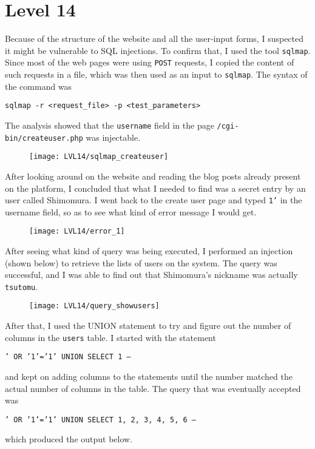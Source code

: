 \documentclass[12pt,a4paper]{article}
\begin{document}
	\section*{Level 14}
	Because of the structure of the website and all the user-input forms, I suspected it might be vulnerable to SQL injections. To confirm that, I used the tool \texttt{sqlmap}. Since most of the web pages were using \texttt{POST} requests, I copied the content of such requests in a file, which was then used as an input to \texttt{sqlmap}. The syntax of the command was \begin{center}\texttt{sqlmap -r <request\_file> -p <test\_parameters>}\end{center}The analysis showed that the \texttt{username} field in the page \texttt{/cgi-bin/createuser.php} was injectable.
	\begin{figure}[H]
		\centering
		\texttt{[image: LVL14/sqlmap\_createuser]}
		\label{fig:sqlmap}
	\end{figure}
	After looking around on the website and reading the blog posts already present on the platform, I concluded that what I needed to find was a secret entry by an user called Shimomura. I went back to the create user page and typed \texttt{1'} in the username field, so as to see what kind of error message I would get.
	\begin{figure}[H]
		\centering
		\texttt{[image: LVL14/error\_1]}
		\label{fig:error1}
	\end{figure}
	After seeing what kind of query was being executed, I performed an injection (shown below) to retrieve the lists of users on the system. The query was successful, and I was able to find out that Shimomura's nickname was actually \texttt{tsutomu}. 
	\begin{figure}[H]
	\centering
	\texttt{[image: LVL14/query\_showusers]}
	\label{fig:showusers}
	\end{figure}
	After that, I used the UNION statement to try and figure out the number of columns in the \texttt{users} table. I started with the statement \begin{center}\texttt{' OR '1'='1' UNION SELECT 1 -- }\end{center} and kept on adding columns to the statements until the number matched the actual number of columns in the table. The query that was eventually accepted was \begin{center}\texttt{' OR '1'='1' UNION SELECT 1, 2, 3, 4, 5, 6 -- }
	\end{center}which produced the output below.
\end{document}
